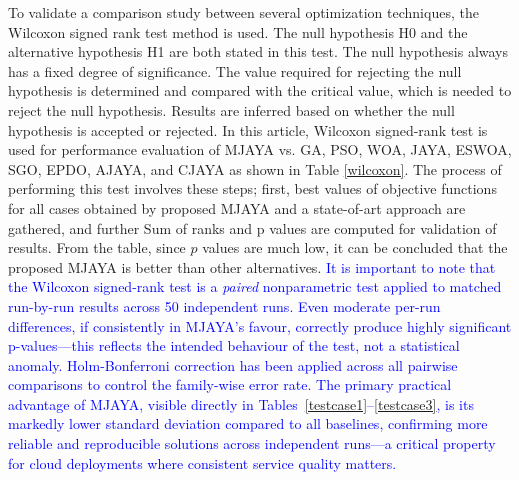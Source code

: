 \documentclass[3p,twocolumn]{elsarticle}
\theoremstyle{thmstyleone}%
\theoremstyle{thmstyletwo}%
\theoremstyle{thmstylethree}%
\begin{document}
To validate a comparison study between several optimization techniques, the Wilcoxon signed rank test method  \cite{gibbons2014nonparametric} is used. The null hypothesis H0 and the alternative hypothesis H1 are both stated in this test. The null hypothesis always has a fixed degree of significance.
The value required for rejecting the null hypothesis is determined and compared with the critical value, which is needed to reject the null hypothesis.
Results are inferred based on whether the null hypothesis is accepted or rejected. In this article, Wilcoxon signed-rank test is used for performance evaluation of MJAYA vs. GA, PSO, WOA, JAYA, ESWOA, SGO, EPDO, AJAYA, and CJAYA as shown in Table \ref{wilcoxon}. The process of performing this test involves these steps; first, best values of objective functions for all cases obtained by proposed MJAYA and a state-of-art approach are gathered, and further Sum of ranks and p values are computed for validation of results. From the table, since $p$ values are much low, it can be concluded that the proposed MJAYA is better than other alternatives. \textcolor{blue}{It is important to note that the Wilcoxon signed-rank test is a \textit{paired} nonparametric test applied to matched run-by-run results across 50 independent runs. Even moderate per-run differences, if consistently in MJAYA's favour, correctly produce highly significant p-values---this reflects the 
intended behaviour of the test, not a statistical anomaly. Holm-Bonferroni correction has been applied across all pairwise comparisons to control the family-wise error rate. The primary practical advantage of MJAYA, visible directly in Tables~\ref{testcase1}--\ref{testcase3}, is its markedly lower standard deviation compared to all baselines, confirming more reliable and reproducible solutions across independent runs---a critical property for cloud deployments where consistent service quality matters.}
\end{document}
